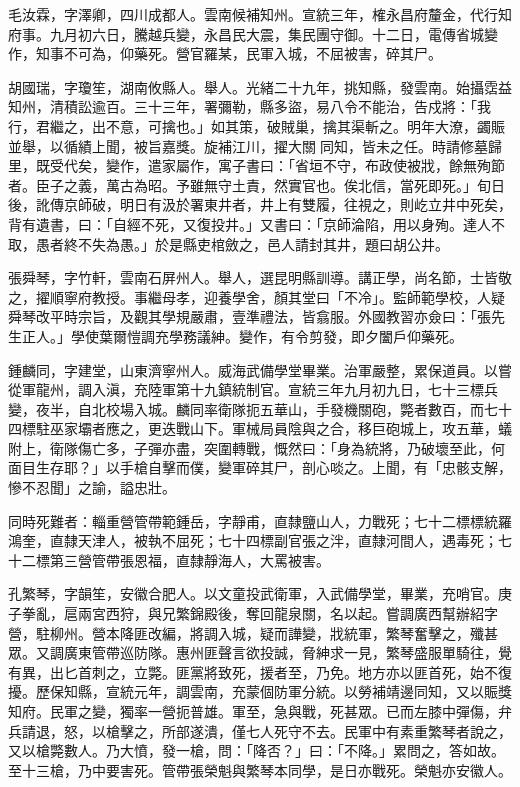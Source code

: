 \begin{pinyinscope}
毛汝霖，字澤卿，四川成都人。雲南候補知州。宣統三年，榷永昌府釐金，代行知府事。九月初六日，騰越兵變，永昌民大震，集民團守御。十二日，電傳省城變作，知事不可為，仰藥死。營官羅某，民軍入城，不屈被害，碎其尸。

胡國瑞，字瓊笙，湖南攸縣人。舉人。光緒二十九年，挑知縣，發雲南。始攝霑益知州，清積訟逾百。三十三年，署彌勒，縣多盜，易八令不能治，告戍將：「我行，君繼之，出不意，可擒也。」如其策，破賊巢，擒其渠斬之。明年大潦，蠲賑並舉，以循績上聞，被旨嘉獎。旋補江川，擢大關同知，皆未之任。時請修墓歸里，既受代矣，變作，遣家屬作，寓子書曰：「省垣不守，布政使被戕，餘無殉節者。臣子之義，萬古為昭。予雖無守土責，然實官也。俟北信，當死即死。」旬日後，訛傳京師破，明日有汲於署東井者，井上有雙履，往視之，則屹立井中死矣，背有遺書，曰：「自經不死，又復投井。」又書曰：「京師淪陷，用以身殉。達人不取，愚者終不失為愚。」於是縣吏棺斂之，邑人請封其井，題曰胡公井。

張舜琴，字竹軒，雲南石屏州人。舉人，選昆明縣訓導。講正學，尚名節，士皆敬之，擢順寧府教授。事繼母孝，迎養學舍，顏其堂曰「不冷」。監師範學校，人疑舜琴改平時宗旨，及觀其學規嚴肅，壹準禮法，皆翕服。外國教習亦僉曰：「張先生正人。」學使葉爾愷調充學務議紳。變作，有令剪發，即夕闔戶仰藥死。

鍾麟同，字建堂，山東濟寧州人。威海武備學堂畢業。治軍嚴整，累保道員。以嘗從軍龍州，調入滇，充陸軍第十九鎮統制官。宣統三年九月初九日，七十三標兵變，夜半，自北校場入城。麟同率衛隊扼五華山，手發機關砲，斃者數百，而七十四標駐巫家壩者應之，更迭戰山下。軍械局員陰與之合，移巨砲城上，攻五華，蟻附上，衛隊傷亡多，子彈亦盡，突圍轉戰，慨然曰：「身為統將，乃破壞至此，何面目生存耶？」以手槍自擊而僕，變軍碎其尸，剖心啖之。上聞，有「忠骸支解，慘不忍聞」之諭，謚忠壯。

同時死難者：輜重營管帶範鍾岳，字靜甫，直隸鹽山人，力戰死；七十二標標統羅鴻奎，直隸天津人，被執不屈死；七十四標副官張之泮，直隸河間人，遇毒死；七十二標第三營管帶張恩福，直隸靜海人，大罵被害。

孔繁琴，字韻笙，安徽合肥人。以文童投武衛軍，入武備學堂，畢業，充哨官。庚子拳亂，扈兩宮西狩，與兄繁錦殿後，奪回龍泉關，名以起。嘗調廣西幫辦紹字營，駐柳州。營本降匪改編，將調入城，疑而譁變，戕統軍，繁琴奮擊之，殲甚眾。又調廣東管帶巡防隊。惠州匪聲言欲投誠，脅紳求一見，繁琴盛服單騎往，覺有異，出匕首刺之，立斃。匪黨將致死，援者至，乃免。地方亦以匪首死，始不復擾。歷保知縣，宣統元年，調雲南，充蒙個防軍分統。以勞補靖邊同知，又以賑獎知府。民軍之變，獨率一營扼普雄。軍至，急與戰，死甚眾。已而左膝中彈傷，弁兵請退，怒，以槍擊之，所部遂潰，僅七人死守不去。民軍中有素重繁琴者說之，又以槍斃數人。乃大憤，發一槍，問：「降否？」曰：「不降。」累問之，答如故。至十三槍，乃中要害死。管帶張榮魁與繁琴本同學，是日亦戰死。榮魁亦安徽人。


\end{pinyinscope}
